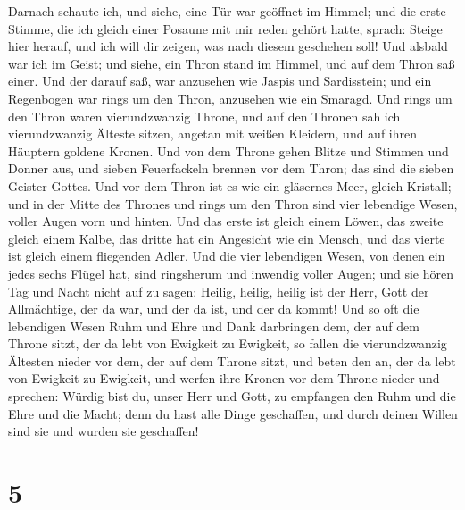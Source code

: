  Darnach schaute ich, und siehe, eine Tür war geöffnet im
Himmel; und die erste Stimme, die ich gleich einer Posaune mit mir reden
gehört hatte, sprach: Steige hier herauf, und ich will dir zeigen, was
nach diesem geschehen soll!  Und alsbald war ich im Geist;
und siehe, ein Thron stand im Himmel, und auf dem Thron saß einer.
 Und der darauf saß, war anzusehen wie Jaspis und
Sardisstein; und ein Regenbogen war rings um den Thron, anzusehen wie
ein Smaragd.  Und rings um den Thron waren vierundzwanzig
Throne, und auf den Thronen sah ich vierundzwanzig Älteste sitzen,
angetan mit weißen Kleidern, und auf ihren Häuptern goldene Kronen.
 Und von dem Throne gehen Blitze und Stimmen und Donner
aus, und sieben Feuerfackeln brennen vor dem Thron; das sind die sieben
Geister Gottes.  Und vor dem Thron ist es wie ein
gläsernes Meer, gleich Kristall; und in der Mitte des Thrones und rings
um den Thron sind vier lebendige Wesen, voller Augen vorn und hinten.
 Und das erste ist gleich einem Löwen, das zweite gleich
einem Kalbe, das dritte hat ein Angesicht wie ein Mensch, und das vierte
ist gleich einem fliegenden Adler.  Und die vier
lebendigen Wesen, von denen ein jedes sechs Flügel hat, sind ringsherum
und inwendig voller Augen; und sie hören Tag und Nacht nicht auf zu
sagen: Heilig, heilig, heilig ist der Herr, Gott der Allmächtige, der da
war, und der da ist, und der da kommt!  Und so oft die
lebendigen Wesen Ruhm und Ehre und Dank darbringen dem, der auf dem
Throne sitzt, der da lebt von Ewigkeit zu Ewigkeit,  so
fallen die vierundzwanzig Ältesten nieder vor dem, der auf dem Throne
sitzt, und beten den an, der da lebt von Ewigkeit zu Ewigkeit, und
werfen ihre Kronen vor dem Throne nieder und sprechen: 
Würdig bist du, unser Herr und Gott, zu empfangen den Ruhm und die Ehre
und die Macht; denn du hast alle Dinge geschaffen, und durch deinen
Willen sind sie und wurden sie geschaffen!

\hypertarget{section-4}{%
\section{5}\label{section-4}}

